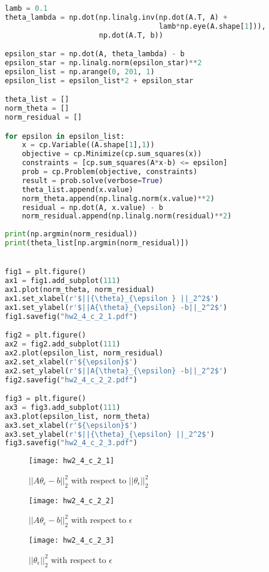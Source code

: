 \documentclass[11pt]{article}
\begin{document}
\begin{enumerate}[label=(\alph*)]
\begin{enumerate}[label=(\roman*)]
\begin{lstlisting}[language=Python, showstringspaces=false]
lamb = 0.1
theta_lambda = np.dot(np.linalg.inv(np.dot(A.T, A) +
                                    lamb*np.eye(A.shape[1])),
                      np.dot(A.T, b))

epsilon_star = np.dot(A, theta_lambda) - b
epsilon_star = np.linalg.norm(epsilon_star)**2
epsilon_list = np.arange(0, 201, 1)
epsilon_list = epsilon_list*2 + epsilon_star

theta_list = []
norm_theta = []
norm_residual = []

for epsilon in epsilon_list:
    x = cp.Variable((A.shape[1],1))
    objective = cp.Minimize(cp.sum_squares(x))
    constraints = [cp.sum_squares(A*x-b) <= epsilon]
    prob = cp.Problem(objective, constraints)
    result = prob.solve(verbose=True)
    theta_list.append(x.value)
    norm_theta.append(np.linalg.norm(x.value)**2)
    residual = np.dot(A, x.value) - b
    norm_residual.append(np.linalg.norm(residual)**2)
   
print(np.argmin(norm_residual))
print(theta_list[np.argmin(norm_residual)])


fig1 = plt.figure()
ax1 = fig1.add_subplot(111)
ax1.plot(norm_theta, norm_residual)
ax1.set_xlabel(r'$||{\theta}_{\epsilon } ||_2^2$')
ax1.set_ylabel(r'$||A{\theta}_{\epsilon} -b||_2^2$')
fig1.savefig("hw2_4_c_2_1.pdf")

fig2 = plt.figure()
ax2 = fig2.add_subplot(111)
ax2.plot(epsilon_list, norm_residual)
ax2.set_xlabel(r'${\epsilon}$')
ax2.set_ylabel(r'$||A{\theta}_{\epsilon} -b||_2^2$')
fig2.savefig("hw2_4_c_2_2.pdf")

fig3 = plt.figure()
ax3 = fig3.add_subplot(111)
ax3.plot(epsilon_list, norm_theta)
ax3.set_xlabel(r'${\epsilon}$')
ax3.set_ylabel(r'$||{\theta}_{\epsilon} ||_2^2$')
fig3.savefig("hw2_4_c_2_3.pdf")
\end{lstlisting}

\begin{figure}[H]
\centering
\texttt{[image: hw2\_4\_c\_2\_1]}
\caption{$||A{\theta}_\epsilon -b||_2^2$ with respect to $||{\theta}_\epsilon ||_2^2$}
\label{fig: hw2_4_c_2_1}
\end{figure}

\begin{figure}[H]
\centering
\texttt{[image: hw2\_4\_c\_2\_2]}
\caption{$||A{\theta}_\epsilon -b||_2^2$ with respect to $\epsilon$}
\label{fig: hw2_4_c_2_2}
\end{figure}

\begin{figure}[H]
\centering
\texttt{[image: hw2\_4\_c\_2\_3]}
\caption{$||{\theta}_\epsilon ||_2^2$ with respect to $\epsilon$}
\label{fig: hw2_4_c_2_3}
\end{figure}


\end{enumerate}
\end{enumerate}
\end{document}
